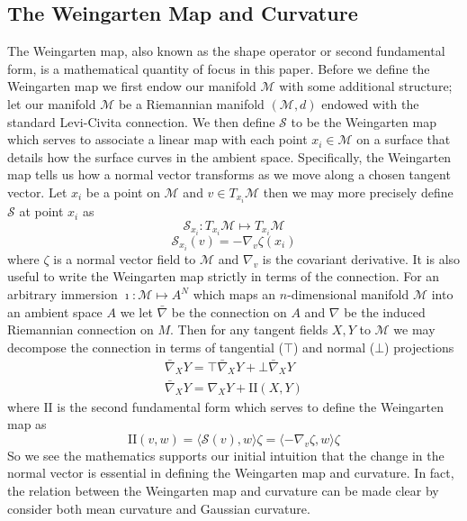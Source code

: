 \documentclass{article}
\begin{document}
\subsection{The Weingarten Map and Curvature}
The Weingarten map, also known as the shape operator or second fundamental form, is a mathematical quantity of focus in this paper. Before we define the Weingarten map we first endow our manifold $\mathcal{M}$ with some additional structure; let our manifold $\mathcal{M}$ be a Riemannian manifold $(\mathcal{M}, d)$ endowed with the standard Levi-Civita connection. We then define $\mathcal{S}$ to be the Weingarten map which serves to associate a linear map with each point $x_i \in \mathcal{M}$ on a surface that details how the surface curves in the ambient space. Specifically, the Weingarten map tells us how a normal vector transforms as we move along a chosen tangent vector. Let $x_i$ be a point on $\mathcal{M}$ and $v \in T_{x_i} \mathcal{M}$ then we may more precisely define $\mathcal{S}$ at point $x_i$ as 
\begin{equation}
    \mathcal{S}_{x_{i}} : T_{x_i} \mathcal{M} \mapsto T_{x_i} \mathcal{M}
\end{equation}
\begin{equation} \label{shape_op_def}
    \mathcal{S}_{x_{i}} (v) = -\nabla_v \zeta(x_i) 
\end{equation}
where $\zeta$ is a normal vector field to $\mathcal{M}$ and $\nabla_v$ is the covariant derivative. It is also useful to write the Weingarten map strictly in terms of the connection. For an arbitrary immersion $\imath: \mathcal{M} \mapsto A^N$ which maps an $n$-dimensional manifold $\mathcal{M}$ into an ambient space $A$ we let $\bar{\nabla}$ be the connection on $A$ and $\nabla$ be the induced Riemannian connection on $M$. Then for any tangent fields $X,Y$ to $\mathcal{M}$ we may decompose the connection in terms of tangential ($\top$) and normal ($\bot$) projections \cite{spivak_2005} 
\begin{equation}
    \begin{gathered}
    \bar{\nabla}_{X}Y = \top \bar{\nabla}_X Y + \bot \bar{\nabla}_XY \\
    \bar{\nabla}_{X}Y = \nabla_{X}Y + \mathrm{I\!I}(X,Y)
    \end{gathered}
\end{equation}
where $\mathrm{I\!I}$ is the second fundamental form which serves to define the Weingarten map as
\begin{equation}
    \mathrm{I\!I}(v,w) = \langle \mathcal{S} (v), w \rangle \zeta = \langle -\nabla_v \zeta, w \rangle \zeta 
\end{equation}
So we see the mathematics supports our initial intuition that the change in the normal vector is essential in defining the Weingarten map and curvature. In fact, the relation between the Weingarten map and curvature can be made clear by consider both mean curvature and Gaussian curvature.
\end{document}
